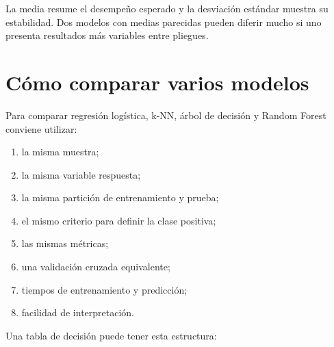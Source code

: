 \documentclass[
  spanish,
  10.5pt,
  letterpaper,
  openany,
  headings=big]{scrbook}
\providecommand{\tightlist}{%
  \setlength{\itemsep}{0pt}\setlength{\parskip}{0pt}}
\begin{document}
\begin{tcolorbox}[enhanced jigsaw, arc=.35mm, bottomrule=.15mm, bottomtitle=1mm, breakable, colback=white, colbacktitle=quarto-callout-tip-color!10!white, colframe=quarto-callout-tip-color-frame, coltitle=black, left=2mm, leftrule=.75mm, opacityback=0, opacitybacktitle=0.6, rightrule=.15mm, title=\textcolor{quarto-callout-tip-color}{\faLightbulb}\hspace{0.5em}{Interpretación}, titlerule=0mm, toprule=.15mm, toptitle=1mm]

La media resume el desempeño esperado y la desviación estándar muestra
su estabilidad. Dos modelos con medias parecidas pueden diferir mucho si
uno presenta resultados más variables entre pliegues.

\end{tcolorbox}

\section{Cómo comparar varios
modelos}\label{cuxf3mo-comparar-varios-modelos}

Para comparar regresión logística, k-NN, árbol de decisión y Random
Forest conviene utilizar:

\begin{enumerate}
\def\labelenumi{\arabic{enumi}.}
\tightlist
\item
  la misma muestra;
\item
  la misma variable respuesta;
\item
  la misma partición de entrenamiento y prueba;
\item
  el mismo criterio para definir la clase positiva;
\item
  las mismas métricas;
\item
  una validación cruzada equivalente;
\item
  tiempos de entrenamiento y predicción;
\item
  facilidad de interpretación.
\end{enumerate}

Una tabla de decisión puede tener esta estructura:
\end{document}
